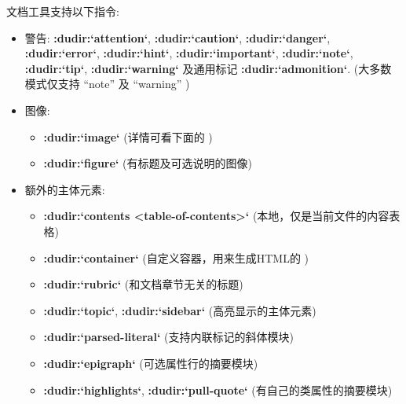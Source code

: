 \documentclass[letterpaper,10pt,english]{sphinxmanual}
\begin{document}
文档工具支持以下指令:
\begin{itemize}
\item {} 
警告: {\color{red}\bfseries{}:dudir:{}`attention{}`}, {\color{red}\bfseries{}:dudir:{}`caution{}`}, {\color{red}\bfseries{}:dudir:{}`danger{}`},
{\color{red}\bfseries{}:dudir:{}`error{}`}, {\color{red}\bfseries{}:dudir:{}`hint{}`}, {\color{red}\bfseries{}:dudir:{}`important{}`}, {\color{red}\bfseries{}:dudir:{}`note{}`},
{\color{red}\bfseries{}:dudir:{}`tip{}`}, {\color{red}\bfseries{}:dudir:{}`warning{}`} 及通用标记 {\color{red}\bfseries{}:dudir:{}`admonition{}`}.
(大多数模式仅支持 ``note'' 及 ``warning'' )

\item {} 
图像:
\begin{itemize}
\item {} 
{\color{red}\bfseries{}:dudir:{}`image{}`} (详情可看下面的 {\hyperref[rest:id129]{}} )

\item {} 
{\color{red}\bfseries{}:dudir:{}`figure{}`} (有标题及可选说明的图像)

\end{itemize}

\item {} 
额外的主体元素:
\begin{itemize}
\item {} 
{\color{red}\bfseries{}:dudir:{}`contents \textless{}table-of-contents\textgreater{}{}`} (本地，仅是当前文件的内容表格)

\item {} 
{\color{red}\bfseries{}:dudir:{}`container{}`} (自定义容器，用来生成HTML的  )

\item {} 
{\color{red}\bfseries{}:dudir:{}`rubric{}`} (和文档章节无关的标题)

\item {} 
{\color{red}\bfseries{}:dudir:{}`topic{}`}, {\color{red}\bfseries{}:dudir:{}`sidebar{}`} (高亮显示的主体元素)

\item {} 
{\color{red}\bfseries{}:dudir:{}`parsed-literal{}`} (支持内联标记的斜体模块)

\item {} 
{\color{red}\bfseries{}:dudir:{}`epigraph{}`} (可选属性行的摘要模块)

\item {} 
{\color{red}\bfseries{}:dudir:{}`highlights{}`}, {\color{red}\bfseries{}:dudir:{}`pull-quote{}`} (有自己的类属性的摘要模块)


\end{itemize}
\end{itemize}
\end{document}
